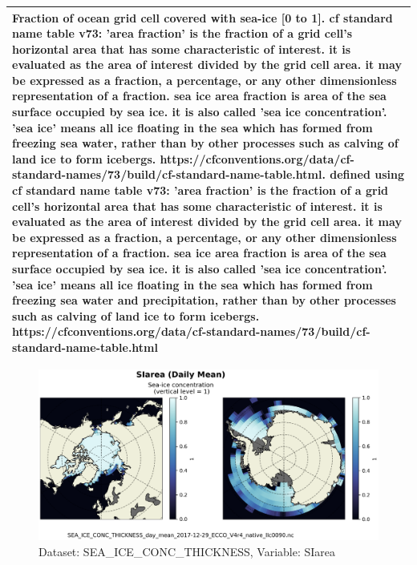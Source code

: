 \begin{longtable}{|m{}|m{}|m{}|m{}|}
\multicolumn{4}{|p{1\textwidth}|}{\footnotesize{{Fraction of ocean grid cell covered with sea-ice [0 to 1]. cf standard name table v73:  'area fraction' is the fraction of a grid cell's horizontal area that has some characteristic of interest. it is evaluated as the area of interest divided by the grid cell area. it may be expressed as a fraction, a percentage, or any other dimensionless representation of a fraction. sea ice area fraction is area of the sea surface occupied by sea ice. it is also called 'sea ice concentration'. 'sea ice' means all ice floating in the sea which has formed from freezing sea water, rather than by other processes such as calving of land ice to form icebergs. https://cfconventions.org/data/cf-standard-names/73/build/cf-standard-name-table.html. defined using cf standard name table v73: 'area fraction' is the fraction of a grid cell's horizontal area that has some characteristic of interest. it is evaluated as the area of interest divided by the grid cell area. it may be expressed as a fraction, a percentage, or any other dimensionless representation of a fraction. sea ice area fraction is area of the sea surface occupied by sea ice. it is also called 'sea ice concentration'. 'sea ice' means all ice floating in the sea which has formed from freezing sea water and precipitation, rather than by other processes such as calving of land ice to form icebergs. https://cfconventions.org/data/cf-standard-names/73/build/cf-standard-name-table.html}}} \\ \hline
\end{longtable}

\begin{figure}[H]
\centering
\includegraphics[scale=0.55]{../images/plots/native_plots/Sea-Ice_and_Snow_Concentration_and_Thickness/SIarea.png}
\caption{Dataset: SEA\_ICE\_CONC\_THICKNESS, Variable: SIarea}
\label{tab:table-SEA_ICE_CONC_THICKNESS_SIarea-Plot}
\end{figure}
\newpage
\pagebreak
